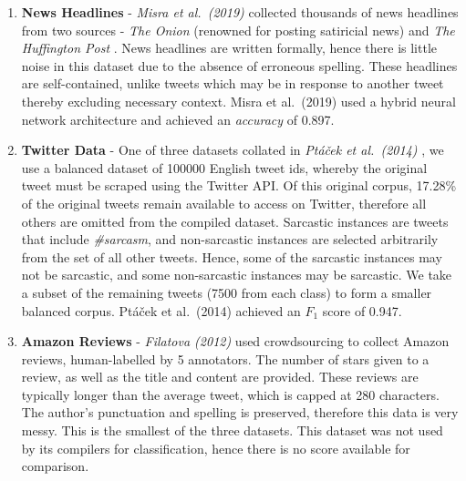 \documentclass[12pt,a4paper]{article}
\begin{document}
\begin{enumerate}[leftmargin=0cm]
	\item \textbf{News Headlines} - \textit{Misra et al.\ (2019)} \cite{misra2019sarcasm} collected thousands of news headlines from two sources - \textit{The Onion} \footnotemark[3] (renowned for posting satiricial news) and \textit{The Huffington Post} \footnotemark[4]. News headlines are written formally, hence there is little noise in this dataset due to the absence of erroneous spelling. These headlines are self-contained, unlike tweets which may be in response to another tweet thereby excluding necessary context. Misra et al.\ (2019) \cite{misra2019sarcasm} used a hybrid neural network architecture and achieved an \textit{accuracy} of 0.897.
	
	\item \textbf{Twitter Data} - One of three datasets collated in \textit{Pt\'a\v{c}ek et al.\ (2014)} \cite{ptavcek2014sarcasm}, we use a balanced dataset of 100000 English tweet ids, whereby the original tweet must be scraped using the Twitter API. Of this original corpus, 17.28\% of the original tweets remain available to access on Twitter, therefore all others are omitted from the compiled dataset. Sarcastic instances are tweets that include \textit{\#sarcasm}, and non-sarcastic instances are selected arbitrarily from the set of all other tweets. Hence, some of the sarcastic instances may not be sarcastic, and some non-sarcastic instances may be sarcastic. We take a subset of the remaining tweets (7500 from each class) to form a smaller balanced corpus. Pt\'a\v{c}ek et al.\ (2014) \cite{ptavcek2014sarcasm} achieved an $F_{1}$ score of 0.947.
	
	\item \textbf{Amazon Reviews} - \textit{Filatova (2012)} \cite{filatova2012irony} used crowdsourcing to collect Amazon reviews, human-labelled by 5 annotators. The number of stars given to a review, as well as the title and content are provided. These reviews are typically longer than the average tweet, which is capped at 280 characters. The author's punctuation and spelling is preserved, therefore this data is very messy. This is the smallest of the three datasets. This dataset was not used by its compilers for classification, hence there is no score available for comparison.
\end{enumerate}

\end{document}
